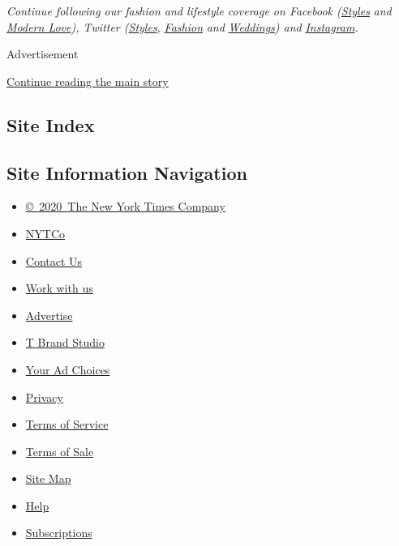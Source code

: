 \emph{Continue following our fashion and lifestyle coverage on Facebook
(}\href{https://www.facebookcorewwwi.onion/nytimesstyles}{\emph{Styles}}
\emph{and}
\href{https://www.facebookcorewwwi.onion/modernlove}{\emph{Modern
Love}}\emph{), Twitter
(}\href{https://twitter.com/nytstyles}{\emph{Styles}}\emph{,}
\href{https://twitter.com/nytfashion}{\emph{Fashion}} \emph{and}
\href{https://twitter.com/nytimesvows}{\emph{Weddings}}\emph{) and}
\href{https://instagram.com/nytimesfashion}{\emph{Instagram}}\emph{.}

Advertisement

\protect\hyperlink{after-bottom}{Continue reading the main story}

\hypertarget{site-index}{%
\subsection{Site Index}\label{site-index}}

\hypertarget{site-information-navigation}{%
\subsection{Site Information
Navigation}\label{site-information-navigation}}

\begin{itemize}
\tightlist
\item
  \href{https://help.nytimes3xbfgragh.onion/hc/en-us/articles/115014792127-Copyright-notice}{©~2020~The
  New York Times Company}
\end{itemize}

\begin{itemize}
\tightlist
\item
  \href{https://www.nytco.com/}{NYTCo}
\item
  \href{https://help.nytimes3xbfgragh.onion/hc/en-us/articles/115015385887-Contact-Us}{Contact
  Us}
\item
  \href{https://www.nytco.com/careers/}{Work with us}
\item
  \href{https://nytmediakit.com/}{Advertise}
\item
  \href{http://www.tbrandstudio.com/}{T Brand Studio}
\item
  \href{https://www.nytimes3xbfgragh.onion/privacy/cookie-policy\#how-do-i-manage-trackers}{Your
  Ad Choices}
\item
  \href{https://www.nytimes3xbfgragh.onion/privacy}{Privacy}
\item
  \href{https://help.nytimes3xbfgragh.onion/hc/en-us/articles/115014893428-Terms-of-service}{Terms
  of Service}
\item
  \href{https://help.nytimes3xbfgragh.onion/hc/en-us/articles/115014893968-Terms-of-sale}{Terms
  of Sale}
\item
  \href{https://spiderbites.nytimes3xbfgragh.onion}{Site Map}
\item
  \href{https://help.nytimes3xbfgragh.onion/hc/en-us}{Help}
\item
  \href{https://www.nytimes3xbfgragh.onion/subscription?campaignId=37WXW}{Subscriptions}
\end{itemize}

